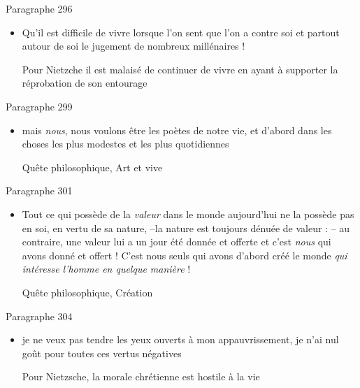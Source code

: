 \documentclass[french,a4paper,11pt,answers]{exam}
\newcommand{\cit}[2]{\og #1 \fg{} \begin{solution}{ #2 }\end{solution}} %
\begin{document}
	\begin{cadre}{Paragraphe 296}
		\begin{itemize}
			\item \cit{Qu'il est difficile de vivre lorsque l'on sent que l'on a contre soi et partout autour de soi le jugement de nombreux millénaires !}
				{Pour Nietzche il est malaisé de continuer de vivre en ayant à supporter la réprobation de son entourage}
		\end{itemize}
	\end{cadre}

	\begin{cadre}{Paragraphe 299}
		\begin{itemize}
			\item \cit{mais \emph{nous}, nous voulons être les poètes de notre vie, et d'abord dans les choses les plus modestes et les plus quotidiennes}
				{Quête philosophique, Art et vive}
		\end{itemize}
	\end{cadre}
	\begin{cadre}{Paragraphe 301}
		\begin{itemize}
			\item \cit{Tout ce qui possède de la \emph{valeur} dans le monde aujourd'hui ne la possède pas en soi, en vertu de sa nature, --la nature est toujours dénuée de valeur : -- au contraire, une valeur lui a un jour été donnée et offerte et c'est \emph{nous} qui avons donné et offert ! C'est nous seuls qui avons d'abord créé le monde \emph{qui intéresse l'homme en quelque manière} !}
				{Quête philosophique, Création}
		\end{itemize}
	\end{cadre}
	
	\begin{cadre}{Paragraphe 304}
		\begin{itemize}
			\item \cit{je ne veux pas tendre les yeux ouverts à mon appauvrissement, je n'ai nul goût pour toutes ces vertus négatives}
				{Pour Nietzsche, la morale chrétienne est hostile à la vie}
		\end{itemize}
	\end{cadre}
	
\end{document}
